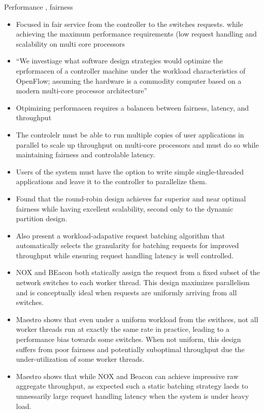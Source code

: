 \begin{itemize}
Performance , fairness 
\begin{itemize}
\item Focused in fair service from the controller to the switches requests. while achieving the maximum performance requirements (low request handling and scalability on multi core processors
\item ``We investiage what software design strategies would optimize the eprformacen of a controller machine under the workload characteristics of OpenFlow; assuming the hardware is a commodity computer based on a modern multi-core processor architecture''
\item Otpimizing performacen requires a balancen between fairness, latency, and throughput 
\item The controlelr must be able to run multiple copies of user applications in parallel to scale up throughput on multi-core processors and must do so while maintaining fairness and controlable latency.
\item Users of the system must have the option to write simple single-threaded applications and leave it to the controller to parallelize them. 
\item Found that the round-robin design achieves far superior and near optimal fairness while having excellent scalability, second only to the dynamic partition design. 
\item Also present a workload-adapative request batching algorithm that automatically selects the granularity for batching requests for improved throughput while ensuring request handling latency is well controlled. 
\item NOX and BEacon both statically assign the request from a fixed subset of the network switches to each worker thread. This design maximizes parallelism and is conceptually ideal when requests are uniformly arriving from all switches. 
\item Maestro shows that even under a uniform workload from the swithces, not all worker threads run at exactly the same rate in practice, leading to a performance bias towards some switches. When not uniform, this design suffers from poor fairness and potentially suboptimal throughput due the under-utilization of some worker threads. 
\item Maestro shows that while NOX and Beacon can achieve impressive raw aggregate throughput, as expected such a static batching strategy laeds to unnessarily large request handling latency when the system is under heavy load. 



\end{itemize}
\end{itemize}
